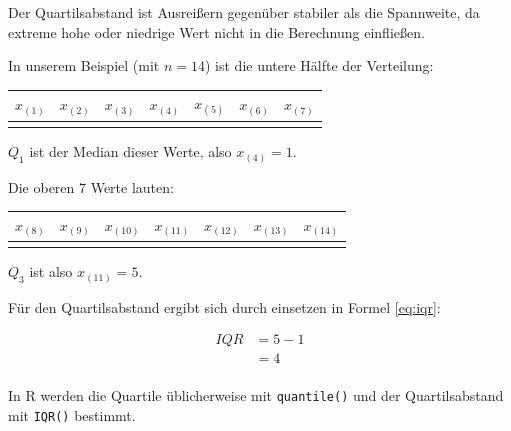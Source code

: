\documentclass[
  11pt,
  ngerman,
  a4paper,
]{report}
\newenvironment{rtip}{
  \medskip
  \begin{tcolorbox}[colframe=purple,colback=light_gray,title=Softwarehinweis]
}{
  \end{tcolorbox}
  \medskip
}
\begin{document}
Der Quartilsabstand ist Ausreißern gegenüber stabiler als die Spannweite, da extreme hohe oder niedrige Wert nicht in die Berechnung einfließen.

In unserem Beispiel (mit \(n=14\)) ist die untere Hälfte der Verteilung:

\begin{table}
\centering
\begin{tabular}{rrrrrrr}
\toprule
\textbf{$x_{(1)}$} & \textbf{$x_{(2)}$} & \textbf{$x_{(3)}$} & \textbf{$x_{(4)}$} & \textbf{$x_{(5)}$} & \textbf{$x_{(6)}$} & \textbf{$x_{(7)}$}\\
\midrule
\cellcolor{gray!6}{0} & \cellcolor{gray!6}{1} & \cellcolor{gray!6}{1} & \cellcolor{gray!6}{1} & \cellcolor{gray!6}{1} & \cellcolor{gray!6}{3} & \cellcolor{gray!6}{3}\\
\bottomrule
\end{tabular}
\end{table}

\(Q_1\) ist der Median dieser Werte, also \(x_{(4)}=1\).

Die oberen 7 Werte lauten:

\begin{table}
\centering
\begin{tabular}{rrrrrrr}
\toprule
\textbf{$x_{(8)}$} & \textbf{$x_{(9)}$} & \textbf{$x_{(10)}$} & \textbf{$x_{(11)}$} & \textbf{$x_{(12)}$} & \textbf{$x_{(13)}$} & \textbf{$x_{(14)}$}\\
\midrule
\cellcolor{gray!6}{4} & \cellcolor{gray!6}{4} & \cellcolor{gray!6}{5} & \cellcolor{gray!6}{5} & \cellcolor{gray!6}{5} & \cellcolor{gray!6}{8} & \cellcolor{gray!6}{25}\\
\bottomrule
\end{tabular}
\end{table}

\(Q_3\) ist also \(x_{(11)} = 5\).

Für den Quartilsabstand ergibt sich durch einsetzen in Formel \eqref{eq:iqr}:

\[
  \begin{aligned}
    \mathit{IQR}&=5-1 \\[4pt]
       &=4 \\[4pt]
  \end{aligned}
\]

\begin{rtip}
In R werden die Quartile üblicherweise mit \verb|quantile()| und der Quartilsabstand mit \verb|IQR()| bestimmt.
\end{rtip}
\end{document}
